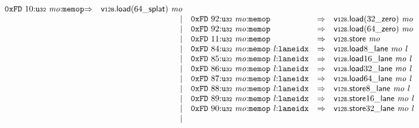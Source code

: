 $$\begin{array}{@{}l@{}rrlll@{}l@{}}
\mathtt{0xFD}~10{:}{\mathtt{u{\scriptstyle32}}}~{\mathit{mo}}{:}{\mathtt{memop}} &\Rightarrow& {\mathsf{v{\scriptstyle128}.load}}{({{64}{\mathsf{\_}}}{\mathsf{splat}})}~{\mathit{mo}} \\ &&|&
\mathtt{0xFD}~92{:}{\mathtt{u{\scriptstyle32}}}~{\mathit{mo}}{:}{\mathtt{memop}} &\Rightarrow& {\mathsf{v{\scriptstyle128}.load}}{({{32}{\mathsf{\_}}}{\mathsf{zero}})}~{\mathit{mo}} \\ &&|&
\mathtt{0xFD}~92{:}{\mathtt{u{\scriptstyle32}}}~{\mathit{mo}}{:}{\mathtt{memop}} &\Rightarrow& {\mathsf{v{\scriptstyle128}.load}}{({{64}{\mathsf{\_}}}{\mathsf{zero}})}~{\mathit{mo}} \\ &&|&
\mathtt{0xFD}~11{:}{\mathtt{u{\scriptstyle32}}}~{\mathit{mo}}{:}{\mathtt{memop}} &\Rightarrow& \mathsf{v{\scriptstyle128}.store}~{\mathit{mo}} \\ &&|&
\mathtt{0xFD}~84{:}{\mathtt{u{\scriptstyle32}}}~{\mathit{mo}}{:}{\mathtt{memop}}~{\mathit{l}}{:}{\mathtt{laneidx}} &\Rightarrow& {{{\mathsf{v{\scriptstyle128}.load}}{8}}{\mathsf{\_}}}{\mathsf{lane}}~{\mathit{mo}}~{\mathit{l}} \\ &&|&
\mathtt{0xFD}~85{:}{\mathtt{u{\scriptstyle32}}}~{\mathit{mo}}{:}{\mathtt{memop}}~{\mathit{l}}{:}{\mathtt{laneidx}} &\Rightarrow& {{{\mathsf{v{\scriptstyle128}.load}}{16}}{\mathsf{\_}}}{\mathsf{lane}}~{\mathit{mo}}~{\mathit{l}} \\ &&|&
\mathtt{0xFD}~86{:}{\mathtt{u{\scriptstyle32}}}~{\mathit{mo}}{:}{\mathtt{memop}}~{\mathit{l}}{:}{\mathtt{laneidx}} &\Rightarrow& {{{\mathsf{v{\scriptstyle128}.load}}{32}}{\mathsf{\_}}}{\mathsf{lane}}~{\mathit{mo}}~{\mathit{l}} \\ &&|&
\mathtt{0xFD}~87{:}{\mathtt{u{\scriptstyle32}}}~{\mathit{mo}}{:}{\mathtt{memop}}~{\mathit{l}}{:}{\mathtt{laneidx}} &\Rightarrow& {{{\mathsf{v{\scriptstyle128}.load}}{64}}{\mathsf{\_}}}{\mathsf{lane}}~{\mathit{mo}}~{\mathit{l}} \\ &&|&
\mathtt{0xFD}~88{:}{\mathtt{u{\scriptstyle32}}}~{\mathit{mo}}{:}{\mathtt{memop}}~{\mathit{l}}{:}{\mathtt{laneidx}} &\Rightarrow& {{{\mathsf{v{\scriptstyle128}.store}}{8}}{\mathsf{\_}}}{\mathsf{lane}}~{\mathit{mo}}~{\mathit{l}} \\ &&|&
\mathtt{0xFD}~89{:}{\mathtt{u{\scriptstyle32}}}~{\mathit{mo}}{:}{\mathtt{memop}}~{\mathit{l}}{:}{\mathtt{laneidx}} &\Rightarrow& {{{\mathsf{v{\scriptstyle128}.store}}{16}}{\mathsf{\_}}}{\mathsf{lane}}~{\mathit{mo}}~{\mathit{l}} \\ &&|&
\mathtt{0xFD}~90{:}{\mathtt{u{\scriptstyle32}}}~{\mathit{mo}}{:}{\mathtt{memop}}~{\mathit{l}}{:}{\mathtt{laneidx}} &\Rightarrow& {{{\mathsf{v{\scriptstyle128}.store}}{32}}{\mathsf{\_}}}{\mathsf{lane}}~{\mathit{mo}}~{\mathit{l}} \\ &&|&

\end{array}$$
